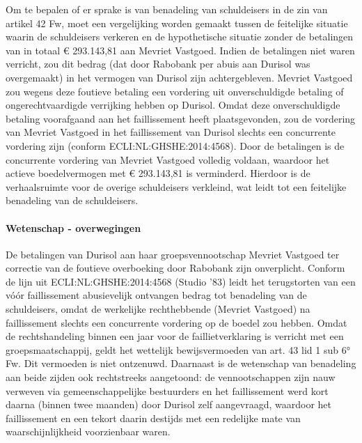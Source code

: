 \documentclass[
  dutch,
  a4paper,
]{article}
\begin{document}
Om te bepalen of er sprake is van benadeling van schuldeisers in de zin van artikel 42 Fw, moet een vergelijking worden gemaakt tussen de feitelijke situatie waarin de schuldeisers verkeren en de hypothetische situatie zonder de betalingen van in totaal € 293.143,81 aan Mevriet Vastgoed. Indien de betalingen niet waren verricht, zou dit bedrag (dat door Rabobank per abuis aan Durisol was overgemaakt) in het vermogen van Durisol zijn achtergebleven. Mevriet Vastgoed zou wegens deze foutieve betaling een vordering uit onverschuldigde betaling of ongerechtvaardigde verrijking hebben op Durisol. Omdat deze onverschuldigde betaling voorafgaand aan het faillissement heeft plaatsgevonden, zou de vordering van Mevriet Vastgoed in het faillissement van Durisol slechts een concurrente vordering zijn (conform ECLI:NL:GHSHE:2014:4568). Door de betalingen is de concurrente vordering van Mevriet Vastgoed volledig voldaan, waardoor het actieve boedelvermogen met € 293.143,81 is verminderd. Hierdoor is de verhaalsruimte voor de overige schuldeisers verkleind, wat leidt tot een feitelijke benadeling van de schuldeisers.

\paragraph{Wetenschap - overwegingen}\label{wetenschap---overwegingen-17}

De betalingen van Durisol aan haar groepsvennootschap Mevriet Vastgoed ter correctie van de foutieve overboeking door Rabobank zijn onverplicht. Conform de lijn uit ECLI:NL:GHSHE:2014:4568 (Studio '83) leidt het terugstorten van een vóór faillissement abusievelijk ontvangen bedrag tot benadeling van de schuldeisers, omdat de werkelijke rechthebbende (Mevriet Vastgoed) na faillissement slechts een concurrente vordering op de boedel zou hebben. Omdat de rechtshandeling binnen een jaar voor de faillietverklaring is verricht met een groepsmaatschappij, geldt het wettelijk bewijsvermoeden van art. 43 lid 1 sub 6° Fw. Dit vermoeden is niet ontzenuwd. Daarnaast is de wetenschap van benadeling aan beide zijden ook rechtstreeks aangetoond: de vennootschappen zijn nauw verweven via gemeenschappelijke bestuurders en het faillissement werd kort daarna (binnen twee maanden) door Durisol zelf aangevraagd, waardoor het faillissement en een tekort daarin destijds met een redelijke mate van waarschijnlijkheid voorzienbaar waren.

\newpage

\end{document}
